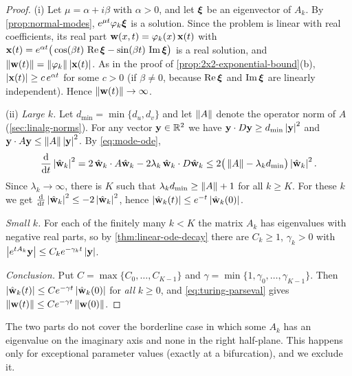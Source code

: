 \begin{proof}
(i) Let $\mu=\alpha+i\beta$ with $\alpha>0$, and let $\boldsymbol{\xi}$ be an eigenvector of
$A_k$. By \cref{prop:normal-modes}, $e^{\mu t}\varphi_k\boldsymbol{\xi}$ is a solution. Since
the problem is linear with real coefficients, its real part
$\mathbf{w}(x,t)=\varphi_k(x)\,\mathbf{x}(t)$ with
$\mathbf{x}(t)=e^{\alpha t}\big(\cos(\beta t)\,\operatorname{Re}\boldsymbol{\xi}-\sin(\beta t)\,\operatorname{Im}\boldsymbol{\xi}\big)$
is a real solution, and $\left\lVert \mathbf{w}(t)\right\rVert=\left\lVert \varphi_k\right\rVert\left\lvert \mathbf{x}(t)\right\rvert$. As in
the proof of \cref{prop:2x2-exponential-bound}(b), $\left\lvert \mathbf{x}(t)\right\rvert\ge c\,e^{\alpha t}$
for some $c>0$ (if $\beta\ne0$, because $\operatorname{Re}\boldsymbol{\xi}$ and $\operatorname{Im}\boldsymbol{\xi}$ are linearly
independent). Hence $\left\lVert \mathbf{w}(t)\right\rVert\to\infty$.

(ii) \emph{Large $k$.} Let $d_{\min}=\min\{d_u,d_v\}$ and let $\left\lVert A\right\rVert$ denote the
operator norm of $A$ (\cref{sec:linalg-norms}). For any vector $\mathbf{y}\in\mathbb{R}^2$ we have
$\mathbf{y}\cdot D\mathbf{y}\ge d_{\min}\left\lvert \mathbf{y}\right\rvert^2$ and
$\mathbf{y}\cdot A\mathbf{y}\le\left\lVert A\right\rVert\left\lvert \mathbf{y}\right\rvert^2$. By \eqref{eq:mode-ode},
\begin{equation*}
  \frac{\mathrm d}{\mathrm dt}\left\lvert \hat{\mathbf{w}}_k\right\rvert^2
  = 2\,\hat{\mathbf{w}}_k\cdot A\hat{\mathbf{w}}_k - 2\lambda_k\,\hat{\mathbf{w}}_k\cdot D\hat{\mathbf{w}}_k
  \le 2\big(\left\lVert A\right\rVert-\lambda_kd_{\min}\big)\left\lvert \hat{\mathbf{w}}_k\right\rvert^2 .
\end{equation*}
Since $\lambda_k\to\infty$, there is $K$ such that $\lambda_kd_{\min}\ge\left\lVert A\right\rVert+1$ for
all $k\ge K$. For these $k$ we get $\frac{\mathrm d}{\mathrm dt}\left\lvert \hat{\mathbf{w}}_k\right\rvert^2\le
-2\left\lvert \hat{\mathbf{w}}_k\right\rvert^2$, hence $\left\lvert \hat{\mathbf{w}}_k(t)\right\rvert\le e^{-t}\left\lvert \hat{\mathbf{w}}_k(0)\right\rvert$.

\emph{Small $k$.} For each of the finitely many $k<K$ the matrix $A_k$ has
eigenvalues with negative real parts, so by \cref{thm:linear-ode-decay} there are
$C_k\ge1$, $\gamma_k>0$ with $\left\lvert e^{tA_k}\mathbf{y}\right\rvert\le C_ke^{-\gamma_kt}\left\lvert \mathbf{y}\right\rvert$.

\emph{Conclusion.} Put $C=\max\{C_0,\dots,C_{K-1}\}$ and
$\gamma=\min\{1,\gamma_0,\dots,\gamma_{K-1}\}$. Then
$\left\lvert \hat{\mathbf{w}}_k(t)\right\rvert\le Ce^{-\gamma t}\left\lvert \hat{\mathbf{w}}_k(0)\right\rvert$ for \emph{all} $k\ge0$, and
\eqref{eq:turing-parseval} gives $\left\lVert \mathbf{w}(t)\right\rVert\le Ce^{-\gamma t}\left\lVert \mathbf{w}(0)\right\rVert$.
\end{proof}

The two parts do not cover the borderline case in which some $A_k$ has an
eigenvalue on the imaginary axis and none in the right half-plane. This happens
only for exceptional parameter values (exactly at a bifurcation), and we exclude it.

